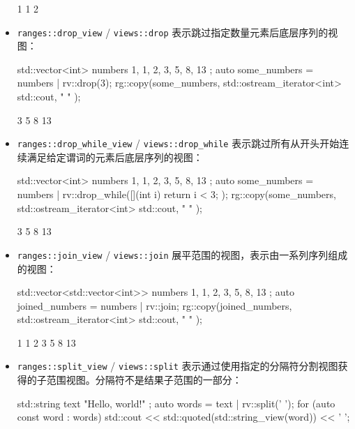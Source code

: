 \begin{itemize}
\begin{shell}
1 1 2
\end{shell}

\item
\verb|ranges::drop_view| / \verb|views::drop| 表示跳过指定数量元素后底层序列的视图：

\begin{cpp}
std::vector<int> numbers{ 1, 1, 2, 3, 5, 8, 13 };
auto some_numbers = numbers | rv::drop(3);
rg::copy(some_numbers, std::ostream_iterator<int>{ std::cout, " " });
\end{cpp}

\begin{shell}
3 5 8 13
\end{shell}

\item
\verb|ranges::drop_while_view| / \verb|views::drop_while| 表示跳过所有从开头开始连续满足给定谓词的元素后底层序列的视图：

\begin{cpp}
std::vector<int> numbers{ 1, 1, 2, 3, 5, 8, 13 };
auto some_numbers = numbers |
                    rv::drop_while([](int i) {
                        return i < 3; });
rg::copy(some_numbers, std::ostream_iterator<int>{ std::cout, " " });
\end{cpp}

\begin{shell}
3 5 8 13
\end{shell}

\item
\verb|ranges::join_view| / \verb|views::join| 展平范围的视图，表示由一系列序列组成的视图：

\begin{cpp}
std::vector<std::vector<int>> numbers{ {1, 1}, {2, 3}, {5, 8}, {13} };
auto joined_numbers = numbers | rv::join;
rg::copy(joined_numbers, std::ostream_iterator<int>{ std::cout, " " });
\end{cpp}

\begin{shell}
1 1 2 3 5 8 13
\end{shell}

\item
\verb|ranges::split_view| / \verb|views::split| 表示通过使用指定的分隔符分割视图获得的子范围视图。分隔符不是结果子范围的一部分：

\begin{cpp}
std::string text{ "Hello, world!" };
auto words = text | rv::split(' ');
for (auto const word : words)
{
    std::cout << std::quoted(std::string_view(word)) << ' ';
}
\end{cpp}


\end{itemize}
